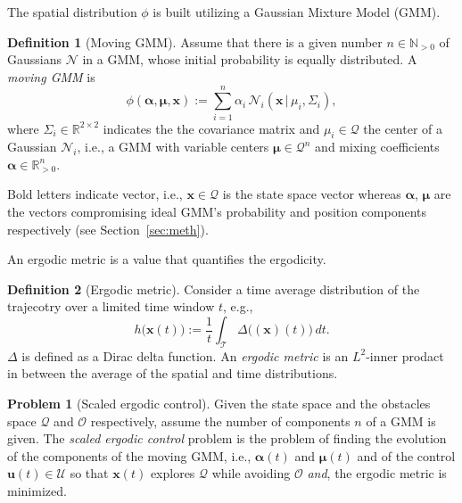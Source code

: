 \documentclass[letterpaper,10pt,conference,twoside]{IEEEtran}
\theoremstyle{definition}
\newtheorem{defn}{Definition}[section]
\newtheorem{pb}{Problem}[section]
\begin{document}
The spatial distribution $\phi$ is built utilizing a Gaussian Mixture Model (GMM). 
\begin{defn}[Moving GMM]\label{def:movement}
  Assume that there is a given number $n\in\mathbb{N}_{>0}$ of Gaussians $\mathcal{N}$ in a GMM, whose initial probability is equally distributed. A \textit{moving GMM} is
  \begin{equation}
    \phi(\boldsymbol{\alpha},\boldsymbol{\mu},\mathbf{x}):=\sum_{i=1}^n{\alpha_i\,\mathcal{N}_i(\mathbf{x}\,|\,\mu_i,\Sigma_i)},
  \end{equation}
  where $\Sigma_i\in\mathbb{R}^{2\times 2}$ indicates the the covariance matrix and $\mu_i\in\mathcal{Q}$ the center of a Gaussian $\mathcal{N}_i$, i.e., a GMM with variable centers $\boldsymbol{\mu}\in\mathcal{Q}^n$ and mixing coefficients $\boldsymbol{\alpha}\in\mathbb{R}_{>0}^n$.
  
  Bold letters indicate vector, i.e., $\mathbf{x}\in\mathcal{Q}$ is the state space vector whereas $\boldsymbol{\alpha}$, $\boldsymbol{\mu}$ are the vectors compromising ideal GMM's probability and position components respectively (see Section~\ref{sec:meth}).
   
\end{defn}

An ergodic metric is a value that quantifies the ergodicity.
\begin{defn}[Ergodic metric]\label{def:ergomet}
  Consider a time average distribution of the trajecotry over a limited time window $t$, e.g.,
  \begin{equation}
    h\big(\mathbf{x}(t)\big):=\frac{1}{t}\int_\mathcal{T}\Delta\big((\mathbf{x})(t)\big)\,dt.
  \end{equation}
  $\Delta$ is defined as a Dirac delta function. An \textit{ergodic metric} is an $L^2$-inner prodact in between the average of the spatial and time distributions.
\end{defn}

\begin{pb}[Scaled ergodic control]\label{pb}
  Given the state space and the obstacles space $\mathcal{Q}$ and $\mathcal{O}$ respectively, assume the number of components $n$ of a GMM is given. The \textit{scaled ergodic control} problem is the problem of finding the evolution of the components of the moving GMM, i.e., $\boldsymbol{\alpha}(t)$ and $\boldsymbol{\mu}(t)$ and of the control $\mathbf{u}(t)\in\mathcal{U}$ so that $\mathbf{x}(t)$ explores $\mathcal{Q}$ while avoiding $\mathcal{O}$ \textit{and}, the ergodic metric is minimized.
\end{pb}
\end{document}
